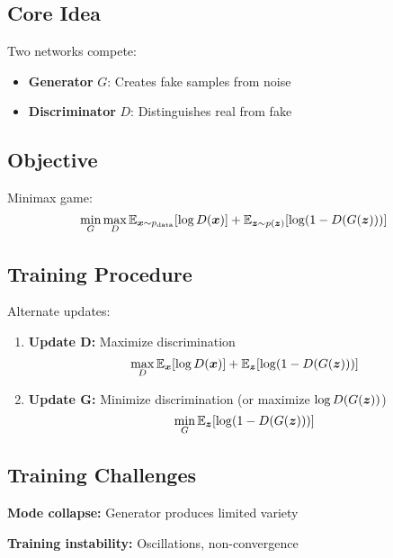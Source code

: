 \subsection{Core Idea}

Two networks compete:
\begin{itemize}
    \item \textbf{Generator} $G$: Creates fake samples from noise
    \item \textbf{Discriminator} $D$: Distinguishes real from fake
\end{itemize}

\subsection{Objective}

Minimax game:
\begin{equation}
\min_G \max_D \mathbb{E}_{\boldsymbol{x} \sim p_{\text{data}}}[\log D(\boldsymbol{x})] + \mathbb{E}_{\boldsymbol{z} \sim p(\boldsymbol{z})}[\log(1 - D(G(\boldsymbol{z})))]
\end{equation}

\subsection{Training Procedure}

Alternate updates:
\begin{enumerate}
    \item \textbf{Update D:} Maximize discrimination
    \begin{equation}
    \max_D \mathbb{E}_{\boldsymbol{x}}[\log D(\boldsymbol{x})] + \mathbb{E}_{\boldsymbol{z}}[\log(1 - D(G(\boldsymbol{z})))]
    \end{equation}
    
    \item \textbf{Update G:} Minimize discrimination (or maximize $\log D(G(\boldsymbol{z}))$)
    \begin{equation}
    \min_G \mathbb{E}_{\boldsymbol{z}}[\log(1 - D(G(\boldsymbol{z})))]
    \end{equation}
\end{enumerate}

\subsection{Training Challenges}

\textbf{Mode collapse:} Generator produces limited variety

\textbf{Training instability:} Oscillations, non-convergence

